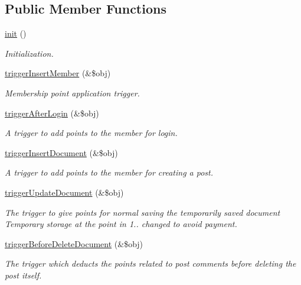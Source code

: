 \subsection*{Public Member Functions}
\begin{DoxyCompactItemize}
\item 
\hyperlink{classpointController_af1b29c5e35e5ab0f5ec004757908c1fe}{init} ()
\begin{DoxyCompactList}\small\item\em Initialization. \end{DoxyCompactList}\item 
\hyperlink{classpointController_a98cfacf9f4a7d0d3f5d0d692ba6d8dc3}{trigger\-Insert\-Member} (\&\$obj)
\begin{DoxyCompactList}\small\item\em Membership point application trigger. \end{DoxyCompactList}\item 
\hyperlink{classpointController_aa0a463b222d4980e729e27e104e11f43}{trigger\-After\-Login} (\&\$obj)
\begin{DoxyCompactList}\small\item\em A trigger to add points to the member for login. \end{DoxyCompactList}\item 
\hyperlink{classpointController_aba87f873c4b2d31e70a9b326e1e6e753}{trigger\-Insert\-Document} (\&\$obj)
\begin{DoxyCompactList}\small\item\em A trigger to add points to the member for creating a post. \end{DoxyCompactList}\item 
\hyperlink{classpointController_a05fba328c369a12065cba849e5c0539c}{trigger\-Update\-Document} (\&\$obj)
\begin{DoxyCompactList}\small\item\em The trigger to give points for normal saving the temporarily saved document Temporary storage at the point in 1.. changed to avoid payment. \end{DoxyCompactList}\item 
\hyperlink{classpointController_a6773e89c36c2ad9086f1e4628149123c}{trigger\-Before\-Delete\-Document} (\&\$obj)
\begin{DoxyCompactList}\small\item\em The trigger which deducts the points related to post comments before deleting the post itself. \end{DoxyCompactList}\item 

\end{DoxyCompactItemize}
